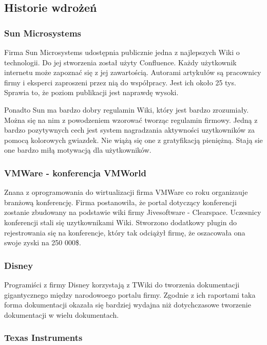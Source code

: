 \documentclass{article}
\begin{document}
	\subsection{Historie wdrożeń} %

\subsubsection{Sun Microsystems} %

	Firma Sun Microsystems udostępnia publicznie jedna z najlepszych Wiki o technologii. Do jej stworzenia został użyty Confluence. Każdy użytkownik internetu może zapoznać się z jej zawartością. Autorami artykułów są pracownicy firmy i eksperci zaproszeni przez nią do współpracy. Jest ich około 25 tys. Sprawia to, że poziom publikacji jest naprawdę wysoki.

	Ponadto Sun ma bardzo dobry regulamin Wiki, który jest bardzo zrozumiały. Można się na nim z powodzeniem wzorować tworząc regulamin firmowy. Jedną z bardzo pozytywnych cech jest system nagradzania aktywności uzytkowników za pomocą kolorowych gwiazdek. Nie wiążą się one z gratyfikacją pieniężną. Stają sie one bardzo miłą motywacją dla użytkowników.


\subsubsection{VMWare - konferencja VMWorld} %
		
Znana z oprogramowania do wirtualizacji firma VMWare co roku organizauje branżową konferencję. Firma postanowiła, że portal dotyczący konferencji zostanie zbudowany na podstawie wiki firmy Jivesoftware - Clearspace. Uczesnicy konferencji stali się uzytkownikami Wiki. Stworzono dodatkowy plugin do rejestrowania się na konferencje, który tak odciążył firmę, że oszacowała ona swoje zyski na 250 000\$.



\subsubsection{Disney}

Programiści z firmy Disney korzystają z TWiki do tworzenia dokumentacji gigantycznego między narodowoego portalu firmy. Zgodnie z ich raportami taka forma dokumentacji okazała się bardziej wydajna niż dotychczasowe tworzenie dokumentacji w wielu dokumentach.


\subsubsection{Texas Instruments}
\end{document}
